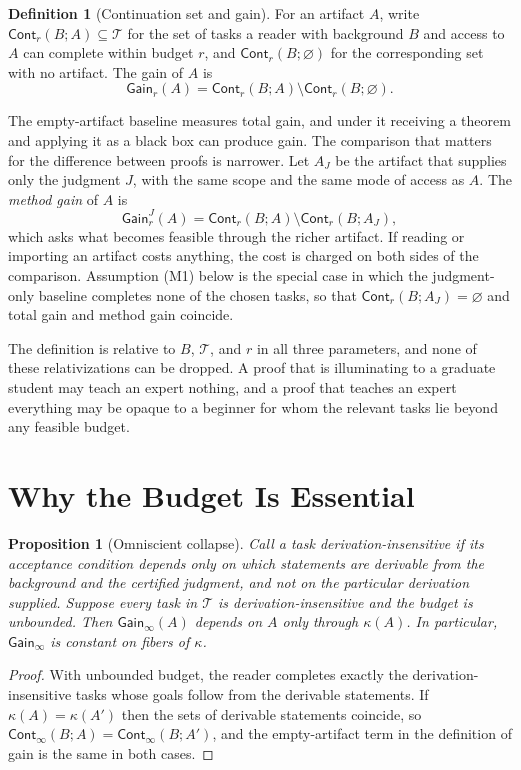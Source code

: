 \documentclass[11pt]{book}
\newtheorem{proposition}[theorem]{Proposition}
\theoremstyle{definition}
\newtheorem{definition}[theorem]{Definition}
\theoremstyle{remark}
\newcommand{\Cont}{\mathsf{Cont}}
\newcommand{\Gain}{\mathsf{Gain}}
\newcommand{\cert}{\kappa}
\begin{document}
\begin{definition}[Continuation set and gain]\label{def:cont}
For an artifact $A$, write $\Cont_r(B;A)\subseteq\mathcal T$ for the set of tasks a reader with background $B$ and access to $A$ can complete within budget $r$, and $\Cont_r(B;\varnothing)$ for the corresponding set with no artifact. The gain of $A$ is
\[
\Gain_r(A)=\Cont_r(B;A)\setminus\Cont_r(B;\varnothing).
\]
\end{definition}

The empty-artifact baseline measures total gain, and under it receiving a theorem and applying it as a black box can produce gain. The comparison that matters for the difference between proofs is narrower. Let $A_J$ be the artifact that supplies only the judgment $J$, with the same scope and the same mode of access as $A$. The \emph{method gain} of $A$ is
\[
\Gain^J_r(A)=\Cont_r(B;A)\setminus\Cont_r(B;A_J),
\]
which asks what becomes feasible through the richer artifact. If reading or importing an artifact costs anything, the cost is charged on both sides of the comparison. Assumption (M1) below is the special case in which the judgment-only baseline completes none of the chosen tasks, so that $\Cont_r(B;A_J)=\varnothing$ and total gain and method gain coincide.

The definition is relative to $B$, $\mathcal T$, and $r$ in all three parameters, and none of these relativizations can be dropped. A proof that is illuminating to a graduate student may teach an expert nothing, and a proof that teaches an expert everything may be opaque to a beginner for whom the relevant tasks lie beyond any feasible budget.

\section{Why the Budget Is Essential}

\begin{proposition}[Omniscient collapse]\label{prop:omni}
Call a task \emph{derivation-insensitive} if its acceptance condition depends only on which statements are derivable from the background and the certified judgment, and not on the particular derivation supplied. Suppose every task in $\mathcal T$ is derivation-insensitive and the budget is unbounded. Then $\Gain_\infty(A)$ depends on $A$ only through $\cert(A)$. In particular, $\Gain_\infty$ is constant on fibers of $\cert$.
\end{proposition}

\begin{proof}
With unbounded budget, the reader completes exactly the derivation-insensitive tasks whose goals follow from the derivable statements. If $\cert(A)=\cert(A')$ then the sets of derivable statements coincide, so $\Cont_\infty(B;A)=\Cont_\infty(B;A')$, and the empty-artifact term in the definition of gain is the same in both cases.
\end{proof}
\end{document}
